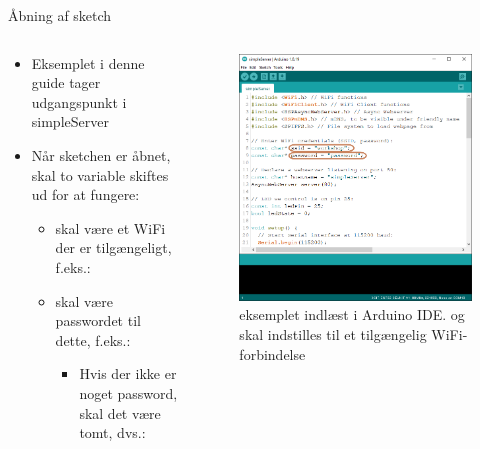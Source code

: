 \documentclass[aspectratio=169]{beamer}
\begin{document}
\begin{frame}{Åbning af sketch}
\begin{columns}

	\begin{column}{0.5\textwidth}
		\begin{textBox}
			\begin{itemize}
				\item Eksemplet i denne guide tager udgangspunkt i simpleServer
				\item Når sketchen er åbnet, skal to variable skiftes ud for at fungere:
				\begin{itemize}
					\item {} skal være et WiFi der er tilgængeligt, f.eks.: 
					\item {} skal være passwordet til dette, f.eks.: 
					\begin{itemize}
						\item Hvis der ikke er noget password, skal det være tomt, dvs.: 
					\end{itemize}
				\end{itemize}
			\end{itemize}
		\end{textBox}
	\end{column}

	\begin{column}{0.5\textwidth}
		\begin{figure}
  			\includegraphics[height=0.6\textheight,keepaspectratio=true]{assets/pictures/simpleServer.png}
  			\caption{ eksemplet indlæst i Arduino IDE.  og  skal indstilles til et tilgængelig WiFi-forbindelse}
  			\label{fig:simpleServer}
		\end{figure}
	\end{column}
	

\end{columns}
\end{frame}
\end{document}
